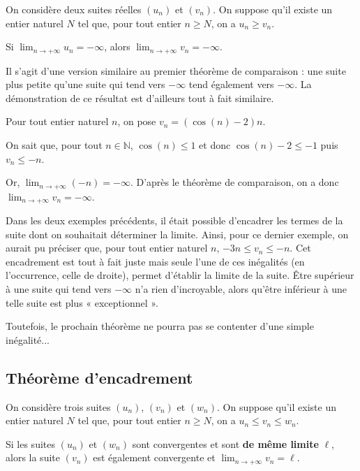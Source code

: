 \documentclass[11pt,fleqn, openany]{book} %
\begin{document}
\begin{theorem}On considère deux suites réelles $(u_n)$ et $(v_n)$. On suppose qu'il existe un entier naturel $N$ tel que, pour tout entier $n \geqslant N$, on a $u_n \geqslant v_n$. 

Si  $\displaystyle \lim_{n \to +\infty} u_n = -\infty$, alors  $\displaystyle \lim_{n \to +\infty} v_n = -\infty $.\end{theorem}

Il s'agit d'une version similaire au premier théorème de comparaison : une suite plus petite qu'une suite qui tend vers $-\infty$ tend également vers $-\infty$. La démonstration de ce résultat est d'ailleurs tout à fait similaire.

\begin{example}Pour tout entier naturel $n$, on pose $v_n=(\cos(n)-2)n$.

On sait que, pour tout $n\in\mathbb{N}$, $\cos(n)\leqslant 1$ et donc $\cos(n)-2 \leqslant -1$ puis $v_n \leqslant -n$.

Or, $\displaystyle\lim_{n \to + \infty}(-n)=-\infty$. D'après le théorème de comparaison, on a donc $\displaystyle\lim_{n \to + \infty}v_n=-\infty$.\end{example}

Dans les deux exemples précédents, il était possible d'encadrer les termes de la suite dont on souhaitait déterminer la limite. Ainsi, pour ce dernier exemple, on aurait pu préciser que, pour tout entier naturel $n$, $-3n \leqslant v_n \leqslant -n$. Cet encadrement est tout à fait juste mais seule l'une de ces inégalités (en l'occurrence, celle de droite), permet d'établir la limite de la suite. Être supérieur à une suite qui tend vers $-\infty$ n'a rien d'incroyable, alors qu'être inférieur à une telle suite est plus « exceptionnel ».

Toutefois, le prochain théorème ne pourra pas se contenter d'une simple inégalité...

\subsection{Théorème d'encadrement}

\begin{theorem}On considère trois suites $(u_n)$, $(v_n)$ et $(w_n)$. On suppose qu'il existe un entier naturel $N$ tel que, pour tout entier $n\geqslant N$, on a $u_n \leqslant v_n \leqslant w_n$.

Si les suites $(u_n)$ et $(w_n)$ sont convergentes et sont \textbf{de même limite} $\ell$, alors la suite $(v_n)$ est également convergente et $\displaystyle\lim_{n\to+\infty}v_n=\ell$.\end{theorem}
\end{document}
